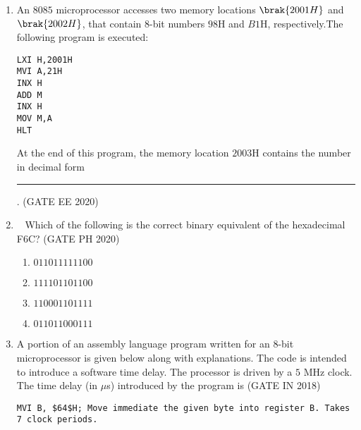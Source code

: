 \begin{enumerate}[label=\arabic*.,ref=\theenumi]
\begin{lstlisting}
L01:jeq r1,r2,end ;if(r1==r2) goto end
L02:lw r5,0(r4)   ;r5<-Memory[r4+0]
L03:shl r5,r5,U1  ;r5<-r5<<U1
L04:sw r5,0(r3)   ;Memory[r3+0]<- r5
L05:add r3,r3,U2  ;r3<-r3+U2
L06:add r4,r4,U3
L07:add r1,r1,1
L08:jmp U4        ;goto U4
L09:end
\end{lstlisting}
Which one of the following options is a CORRECT replacement 
for operands in the position (U1,U2,U3,U4) in the above 
assembly code?
%
\begin{multicols}{2}
\begin{enumerate}
\item (8,4,1,L02)                      
\item (3,4,4,L01)
\item (8,1,1,L02)                             
\item (3,1,1,L01)         
\end{enumerate}
\end{multicols}
\item An $8085$ microprocessor accesses two memory locations $\brak{2001H}$ and $\brak{2002H}$, that contain $8$-bit numbers $98$H and $B1$H, respectively.The following program is executed:
\begin{verbatim}LXI H,2001H
MVI A,21H
INX H
ADD M
INX H
MOV M,A
HLT
\end{verbatim}
		At the end of this program, the memory location $2003$H contains the number in decimal form \rule{1cm}{0.1pt}.
		\hfill (GATE EE 2020)
\item  Which of the following is the correct binary equivalent of the hexadecimal F6C?
	\hfill (GATE PH 2020)
%
\begin{multicols}{2}
\begin{enumerate}
  \item  $0110 1111 1100$
  \item $1111 0110 1100$
  \item $1100 0110 1111$
  \item $0110 1100 0111$
\end{enumerate}
\end{multicols}
\item
\label{prob:gate IN 45}
 A portion of an assembly language program written for an $8$-bit microprocessor is given below along with explanations. The code is intended to introduce a software time delay. The processor is driven by a $5$ MHz clock. The time delay (in $\mu$s) introduced by the program is 
\hfill(GATE IN 2018)
\begin{lstlisting}
MVI B, $64$H; Move immediate the given byte into register B. Takes 7 clock periods.

\end{lstlisting}
\end{enumerate}
